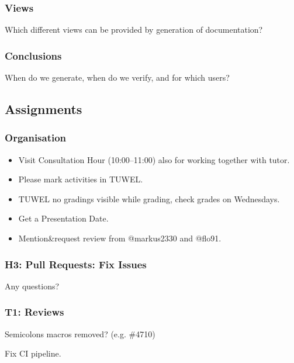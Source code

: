 \breakframe

\begin{frame}
	\frametitle{Views}

	\begin{task}
	Which different views can be provided by generation of documentation?
	\end{task}
\end{frame}


\begin{frame}
	\frametitle{Conclusions}

	\begin{task}
	When do we generate, when do we verify, and for which users?
	\end{task}
\end{frame}


\breakframe


\subsection{Assignments}

\begin{assignment}
	\frametitle{Organisation}

	\begin{task}
	\begin{itemize}[<+-| alert@+>]
	\item Visit Consultation Hour (10:00–11:00) also for working together with tutor.
	\item Please mark activities in TUWEL.
	\item TUWEL no gradings visible while grading, check grades on Wednesdays.
	\item Get a Presentation Date.
	\item Mention\&request review from @markus2330 and @flo91.
	\end{itemize}
	\end{task}
\end{assignment}

\begin{assignment}
	\frametitle{H3: Pull Requests: Fix Issues}

	\begin{task}
	Any questions?
	\end{task}
\end{assignment}

\begin{assignment}
	\frametitle{T1: Reviews}

	Semicolons macros removed? (e.g. \#4710)

	\begin{task}
	Fix CI pipeline.
	\end{task}
\end{assignment}

